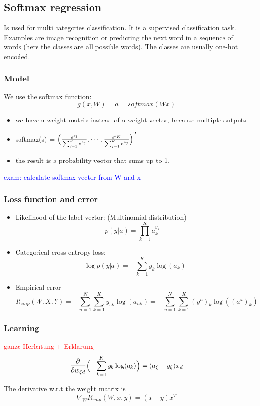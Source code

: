 \documentclass[10pt,a4paper]{article}
\begin{document}
\subsection{Softmax regression}
Is used for multi categories classification. It is a supervised classification task. Examples are image recognition or predicting the next word in a sequence of words (here the classes are all possible words). The classes are usually one-hot encoded.

\subsubsection{Model}
We use the softmax function:
\[ g(x,W) = a = softmax(Wx) \]
\begin{itemize}
\item we have a weight matrix instead of a weight vector, because multiple outputs
\item softmax(s) = $ \Bigl (  \frac{e^{s_1}}{\sum_{j=1}^K e^{e_j}}, \cdots, \frac{e^{s_K}}{\sum_{j=1}^K e^{e_j}}  \Bigr )^T $
\item the result is a probability vector that sums up to 1.
\end{itemize}
\textcolor{blue}{exam: calculate softmax vector from W and x}

\subsubsection{Loss function and error}
\begin{itemize}
\item Likelihood of the label vector: (Multinomial distribution)
\[ p(y|a) = \prod_{k=1}^K a_k^{y_k} \]
\item Categorical cross-entropy loss:
\[ -\log p(y|a) = -\sum_{k=1}^K y_k \log(a_k) \]
\item Empirical error
\[ R_{emp}(W,X,Y) = - \sum_{n=1}^N \sum_{k=1}^K y_{nk} \log(a_{nk}) = -\sum_{n=1}^N \sum_{k=1}^K (y^n)_k \log((a^n)_k)\]
\end{itemize}

\subsubsection{Learning}
\textcolor{red}{ganze Herleitung + Erklärung}
\[ \frac{\partial}{\partial w_{\xi d}} \Bigl (- \sum_{k=1}^K y_k \log(a_k) \Bigr ) = (a_{\xi} - y_{\xi})x_d \]

The derivative w.r.t the weight matrix is
\[ \nabla_W R_{emp}(W, x, y) = (a - y)x^T \]
\end{document}
